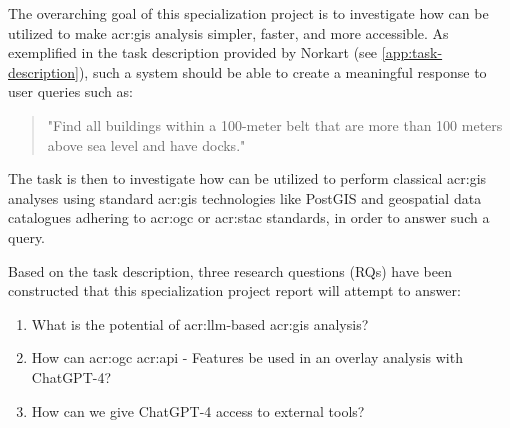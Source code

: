 The overarching goal of this specialization project is to investigate how  can be utilized to make \gls{acr:gis} analysis simpler, faster, and more accessible. As exemplified in the task description provided by Norkart (see \cref{app:task-description}), such a system should be able to create a meaningful response to user queries such as:

\begin{quote}
    "Find all buildings within a 100-meter belt that are more than 100 meters above sea level and have docks."
\end{quote}

\noindent The task is then to investigate how  can be utilized to perform classical \acrshort{acr:gis} analyses using standard \acrshort{acr:gis} technologies like PostGIS and geospatial data catalogues adhering to \acrshort{acr:ogc} or \acrshort{acr:stac} standards, in order to answer such a query.

Based on the task description, three research questions (RQs) have been constructed that this specialization project report will attempt to answer:

\begin{enumerate}
    \item What is the potential of \acrshort{acr:llm}-based \acrshort{acr:gis} analysis? \label{rq:llm-potential}
    \item How can \acrshort{acr:ogc} \acrshort{acr:api} - Features be used in an overlay analysis with ChatGPT-4? \label{rq:overlay-analysis}
    \item How can we give ChatGPT-4 access to external tools? \label{rq:external-tools}
\end{enumerate}

